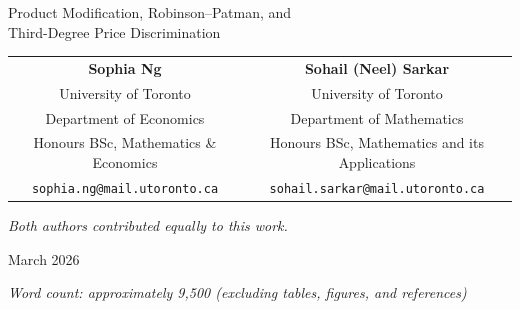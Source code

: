 \documentclass[12pt]{article}
\theoremstyle{definition}
\begin{document}
\begin{titlepage}
\centering
\vspace*{2cm}
{\LARGE Product Modification, Robinson--Patman, and\\[6pt]
Third-Degree Price Discrimination\par}
\vspace{1.8cm}
\begin{tabular}{cc}
\textbf{Sophia Ng} & \textbf{Sohail (Neel) Sarkar} \\[4pt]
University of Toronto & University of Toronto \\
Department of Economics & Department of Mathematics \\
Honours BSc, Mathematics \& Economics & Honours BSc, Mathematics and its Applications \\[6pt]
\texttt{sophia.ng@mail.utoronto.ca} & \texttt{sohail.sarkar@mail.utoronto.ca}
\end{tabular}
\vspace{1.4cm}
{\itshape Both authors contributed equally to this work.}
\vspace{1.4cm}
{\large March 2026\par}
\vfill
\textit{Word count: approximately 9,500 (excluding tables, figures, and references)}
\end{titlepage}

\newpage
{}
\setcounter{page}{1}
\end{document}
